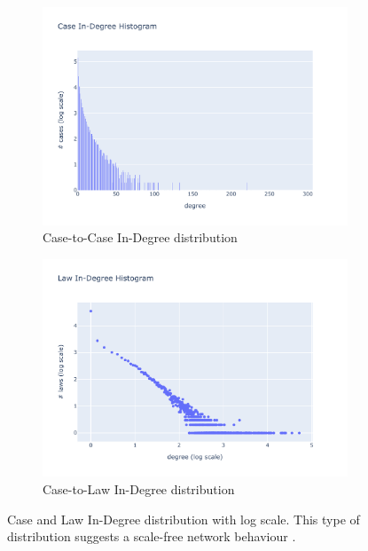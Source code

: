 \documentclass[runningheads]{llncs}
\begin{document}
\begin{figure}[!h]
     \centering
     \begin{subfigure}[b]{0.49\textwidth}
         \centering
         \includegraphics[width=\textwidth]{images/indegree_case.pdf}
         \caption{Case-to-Case In-Degree distribution}
     \end{subfigure}
     \hfill
     \begin{subfigure}[b]{0.49\textwidth}
         \centering
         \includegraphics[width=\textwidth]{images/indegree_law.pdf}
         \caption{Case-to-Law In-Degree distribution}
     \end{subfigure}
    \caption{Case and Law In-Degree distribution with log scale. This type of distribution suggests a scale-free network behaviour \cite{milz2021analysis}.}
    \label{fig:in-degree}
\end{figure}
\end{document}

